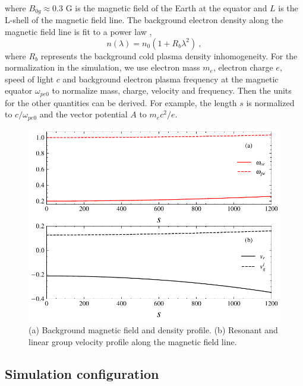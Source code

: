 \documentclass[times,12pt,3p,longtitle]{elsarticle}
\begin{document}
where $B_{0g}\approx $0.3 G is the magnetic field of the Earth  at the equator 
and $L$ is the L-shell of the magnetic field line.
The background electron density along the magnetic field line  is  fit to a power law \cite{denton2004},
\begin{equation}
    n(\lambda) = n_0 (1+R_b \lambda^2)~,
\end{equation}
where $R_b$ represents the 
background cold plasma density inhomogeneity.
For the normalization in the simulation, 
 we use electron mass $m_e$, electron charge $e$, speed of light $c$ and background electron plasma frequency at the magnetic equator $\omega_{pe0}$ to normalize mass, charge, velocity and frequency.
Then the  units for the other quantities can be derived. 
For example,
the length $s $ is normalized to $ c/\omega_{pe0}$
and 
 the vector potential $A$ to $m_e c^2/e$.




   \begin{figure}[htbp]
        \centering
        \includegraphics[scale=0.5]{fig_profile.pdf}
        \caption{(a) Background magnetic field and density profile. (b) Resonant and linear group velocity profile along the magnetic field line.}
        \label{fig.profile}
    \end{figure}
\subsection{Simulation configuration}
\end{document}
